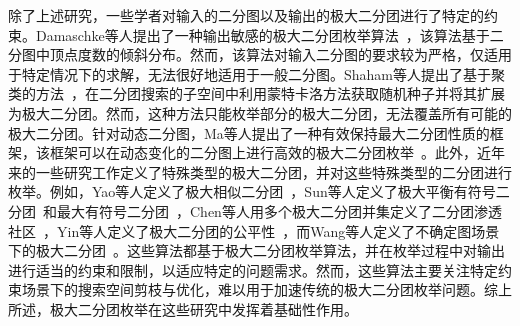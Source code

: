 除了上述研究，一些学者对输入的二分图以及输出的极大二分团进行了特定的约束。Damaschke等人提出了一种输出敏感的极大二分团枚举算法~\cite{Damaschke14}，该算法基于二分图中顶点度数的倾斜分布。然而，该算法对输入二分图的要求较为严格，仅适用于特定情况下的求解，无法很好地适用于一般二分图。Shaham等人提出了基于聚类的方法~\cite{Shaham16}，在二分团搜索的子空间中利用蒙特卡洛方法获取随机种子并将其扩展为极大二分团。然而，这种方法只能枚举部分的极大二分团，无法覆盖所有可能的极大二分团。针对动态二分图，Ma等人提出了一种有效保持最大二分团性质的框架，该框架可以在动态变化的二分图上进行高效的极大二分团枚举~\cite{Ma22}。此外，近年来的一些研究工作定义了特殊类型的极大二分团，并对这些特殊类型的二分团进行枚举。例如，Yao等人定义了极大相似二分团~\cite{SimilarMBE22}，Sun等人定义了极大平衡有符号二分团~\cite{Sun22}和最大有符号二分团~\cite{Sun23}，Chen等人用多个极大二分团并集定义了二分团渗透社区~\cite{BicliqueCommunity23}，Yin等人定义了极大二分团的公平性~\cite{FairMBE23}，而Wang等人定义了不确定图场景下的极大二分团~\cite{MBEU23}。这些算法都基于极大二分团枚举算法，并在枚举过程中对输出进行适当的约束和限制，以适应特定的问题需求。然而，这些算法主要关注特定约束场景下的搜索空间剪枝与优化，难以用于加速传统的极大二分团枚举问题。综上所述，极大二分团枚举在这些研究中发挥着基础性作用。




